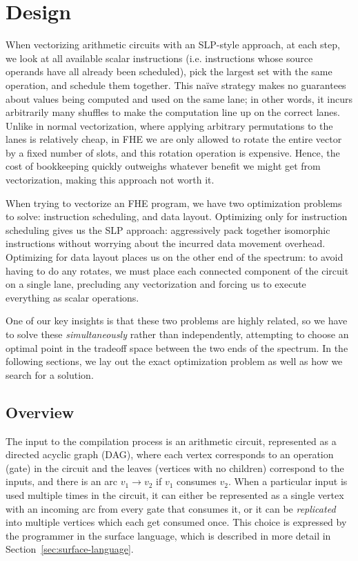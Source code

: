\section{Design}\label{sec:design}
When vectorizing arithmetic circuits with an SLP-style approach, at each step, we look at all available scalar instructions (i.e. instructions whose source operands have all already been scheduled), pick the largest set with the same operation, and schedule them together.
This na\"ive strategy makes no guarantees about values being computed and used on the same lane; in other words, it incurs arbitrarily many shuffles to make the computation line up on the correct lanes.
Unlike in normal vectorization, where applying arbitrary permutations to the lanes is relatively cheap, in FHE we are only allowed to rotate the entire vector by a fixed number of slots, and this rotation operation is expensive.
Hence, the cost of bookkeeping quickly outweighs whatever benefit we might get from vectorization, making this approach not worth it.

When trying to vectorize 
an FHE program, we have two optimization problems to solve: instruction scheduling, and data layout.
Optimizing only for instruction scheduling gives us the SLP approach: aggressively pack together isomorphic instructions without worrying about the incurred data movement overhead.
Optimizing for data layout places us on the other end of the spectrum: to avoid having to do any rotates, we must place each connected component of the circuit on a single lane, precluding any vectorization and forcing us to execute everything as scalar operations.

One of our key insights is that these two problems are highly related, so we have to solve these {\em simultaneously} rather than independently, attempting to choose an optimal point in the tradeoff space between the two ends of the spectrum.
In the following sections, we lay out the exact optimization problem as well as how we search for a solution. 

\subsection{Overview}
The input to the compilation process is an arithmetic circuit, represented as a directed acyclic graph (DAG), where each vertex corresponds to an operation (gate) in the circuit and the leaves (vertices with no children) correspond to the inputs, and there is an arc $v_1 \to v_2$ if $v_1$ consumes $v_2$. 
When a particular input is used multiple times in the circuit, it can either be represented as a single vertex with an incoming arc from every gate that consumes it, or it can be {\em replicated} into multiple vertices which each get consumed once.
This choice is expressed by the programmer in the surface language, which is described in more detail in Section~\ref{sec:surface-language}.

